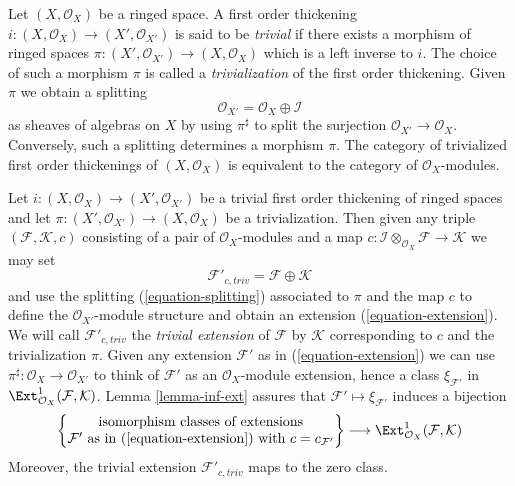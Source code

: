 \begin{remark}
\label{remark-trivial-thickening}
Let $(X, \mathcal{O}_X)$ be a ringed space. A first order thickening
$i : (X, \mathcal{O}_X) \to (X', \mathcal{O}_{X'})$ is said
to be {\it trivial} if there exists a morphism of ringed spaces
$\pi : (X', \mathcal{O}_{X'}) \to (X, \mathcal{O}_X)$ which is a
left inverse to $i$. The choice of such a morphism
$\pi$ is called a {\it trivialization} of the first order thickening.
Given $\pi$ we obtain a splitting
\begin{equation}
\label{equation-splitting}
\mathcal{O}_{X'} = \mathcal{O}_X \oplus \mathcal{I}
\end{equation}
as sheaves of algebras on $X$ by using $\pi^\sharp$ to split the surjection
$\mathcal{O}_{X'} \to \mathcal{O}_X$. Conversely, such a splitting determines
a morphism $\pi$. The category of trivialized first order thickenings of
$(X, \mathcal{O}_X)$ is equivalent to the category of 
$\mathcal{O}_X$-modules.
\end{remark}

\begin{remark}
\label{remark-trivial-extension}
Let $i : (X, \mathcal{O}_X) \to (X', \mathcal{O}_{X'})$
be a trivial first order thickening of ringed spaces
and let $\pi : (X', \mathcal{O}_{X'}) \to (X, \mathcal{O}_X)$
be a trivialization. Then given any triple
$(\mathcal{F}, \mathcal{K}, c)$ consisting of a pair of
$\mathcal{O}_X$-modules and a map
$c : \mathcal{I} \otimes_{\mathcal{O}_X} \mathcal{F} \to \mathcal{K}$
we may set
$$
\mathcal{F}'_{c, triv} = \mathcal{F} \oplus \mathcal{K}
$$
and use the splitting (\ref{equation-splitting}) associated to $\pi$
and the map $c$ to define the $\mathcal{O}_{X'}$-module structure
and obtain an extension (\ref{equation-extension}). We will call
$\mathcal{F}'_{c, triv}$ the {\it trivial extension} of $\mathcal{F}$
by $\mathcal{K}$ corresponding
to $c$ and the trivialization $\pi$. Given any extension
$\mathcal{F}'$ as in (\ref{equation-extension}) we can use
$\pi^\sharp : \mathcal{O}_X \to \mathcal{O}_{X'}$ to think of $\mathcal{F}'$
as an $\mathcal{O}_X$-module extension, hence a class $\xi_{\mathcal{F}'}$
in $\Ext^1_{\mathcal{O}_X}(\mathcal{F}, \mathcal{K})$.
Lemma \ref{lemma-inf-ext} assures that
$\mathcal{F}' \mapsto \xi_{\mathcal{F}'}$
induces a bijection
$$
\left\{
\begin{matrix}
\text{isomorphism classes of extensions}\\
\mathcal{F}'\text{ as in (\ref{equation-extension}) with }c = c_{\mathcal{F}'}
\end{matrix}
\right\}
\longrightarrow
\Ext^1_{\mathcal{O}_X}(\mathcal{F}, \mathcal{K})
$$
Moreover, the trivial extension $\mathcal{F}'_{c, triv}$ maps to the zero class.
\end{remark}

